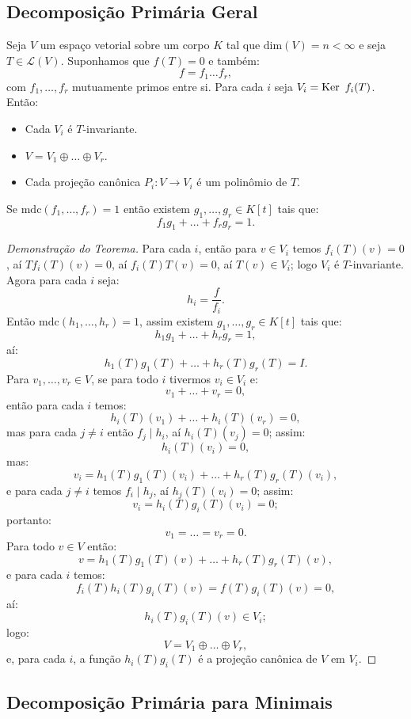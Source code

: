 \documentclass[11pt,twoside,a4paper]{book}
\begin{document}
\subsection{Decomposição Primária Geral}

\begin{teorema}
Seja \(V\) um espaço vetorial sobre um corpo \(K\) tal que
\(\text{dim}(V)=n<\infty\) e seja \(T\in\mathcal{L}(V)\). Suponhamos que
\(f(T)=0\) e também:
\[
f=f_1\ldots f_r,
\]
com $f_1,\dots,f_r$ mutuamente primos entre si. Para cada $i$ seja $V_i=\operatorname{Ker} \ f_i(T)$. Então:
\begin{itemize}
\item Cada $V_i$ é $T$-invariante.
\item $V=V_1\oplus\dots\oplus V_r$.
\item Cada projeção canônica $P_i:V\rightarrow V_i$ é um polinômio de $T$.
\end{itemize}
\end{teorema}
\begin{lema}
Se \(\mathrm{mdc}(f_1,\dots,f_r)=1\) então existem $g_1,\dots,g_r\in K[t]$ tais que:
\[f_1g_1+\dots+f_rg_r=1.\]
\end{lema}
\begin{proof}[Demonstração do Teorema]
Para cada $i$, então para $v\in V_i$ temos $f_i(T)(v)=0$, aí $Tf_i(T)(v)=0$, aí $f_i(T)T(v)=0$, aí $T(v)\in V_i$; logo $V_i$ é $T$-invariante. Agora para cada $i$ seja:
\[
h_i=\frac{f}{f_i}.
\]
Então $\mathrm{mdc}(h_1,\dots,h_r)=1$, assim existem $g_1,\dots,g_r\in K[t]$ tais que:
\[h_1g_1+\dots+h_rg_r=1,\]
aí:
\[
h_1(T)g_1(T)+\dots+h_r(T)g_r(T)=I.
\]
Para $v_1,\dots,v_r\in V$, se para todo $i$ tivermos $v_i\in V_i$ e:
\[
v_1+\dots+v_r=0,
\]
então para cada $i$ temos:
\[
h_i(T)(v_1)+\dots+h_i(T)(v_r)=0,
\]
mas para cada $j\neq i$ então $f_j\mid h_i$, aí $h_i(T)(v_j)=0$; assim:
\[
h_i(T)(v_i)=0,
\]
mas:
\[
v_i=h_1(T)g_1(T)(v_i)+\dots+h_r(T)g_r(T)(v_i),
\]
e para cada $j\neq i$ temos $f_i\mid h_j$, aí $h_j(T)(v_i)=0$; assim:
\[
v_i=h_i(T)g_i(T)(v_i)=0;
\]
portanto:
\[
v_1=\dots=v_r=0.
\]
Para todo $v\in V$ então:
\[
v=h_1(T)g_1(T)(v)+\dots+h_r(T)g_r(T)(v),
\]
e para cada $i$ temos:
\[
f_i(T)h_i(T)g_i(T)(v)=f(T)g_i(T)(v)=0,
\]
aí:
\[
h_i(T)g_i(T)(v)\in V_i;
\]
logo:
\[
V=V_1\oplus\dots\oplus V_r,
\]
e, para cada $i$, a função $h_i(T)g_i(T)$ é a projeção canônica de $V$ em $V_i$.
\end{proof}

\subsection{Decomposição Primária para Minimais}
\end{document}
